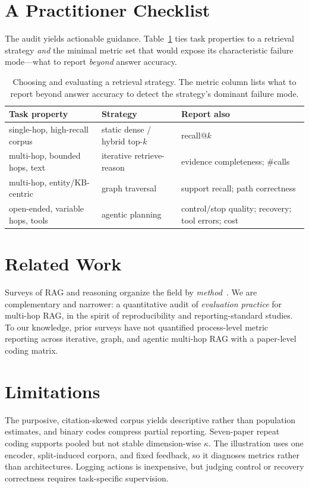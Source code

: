 \documentclass[11pt]{article}
\begin{document}
\section{A Practitioner Checklist}
\label{sec:checklist}
The audit yields actionable guidance. Table~\ref{tab:checklist} ties task properties to a retrieval
strategy \emph{and} the minimal metric set that would expose its characteristic failure mode---what to
report \emph{beyond} answer accuracy.

\begin{table}[t]\centering\small
\caption{Choosing and evaluating a retrieval strategy. The metric column lists what to report beyond
answer accuracy to detect the strategy's dominant failure mode.}
\label{tab:checklist}
\begin{tabular}{@{}p{2.1cm}p{2.2cm}p{2.35cm}@{}}
\toprule
\textbf{Task property} & \textbf{Strategy} & \textbf{Report also} \\
\midrule
single-hop, high-recall corpus & static dense / hybrid top-$k$ & recall@$k$ \\
multi-hop, bounded hops, text & iterative retrieve-reason & evidence completeness; \#calls \\
multi-hop, entity/KB-centric & graph traversal & support recall; path correctness \\
open-ended, variable hops, tools & agentic planning & control/stop quality; recovery; tool errors; cost \\
\bottomrule
\end{tabular}
\end{table}

\section{Related Work}
Surveys of RAG and reasoning organize the field by
\emph{method}~\citep{gao2023survey,rag_reasoning_survey_2025,agentic_rag_survey_2026}. We are
complementary and narrower: a quantitative audit of \emph{evaluation practice} for multi-hop RAG, in
the spirit of reproducibility and reporting-standard studies. To our knowledge, prior surveys have
not quantified process-level metric reporting across iterative, graph, and agentic multi-hop RAG with
a paper-level coding matrix.

\section{Limitations}
The purposive, citation-skewed corpus yields descriptive rather than population estimates, and binary
codes compress partial reporting. Seven-paper repeat coding supports pooled but not stable dimension-wise
$\kappa$. The illustration uses one encoder, split-induced corpora, and fixed feedback, so it diagnoses
metrics rather than architectures. Logging actions is inexpensive, but judging control or recovery correctness
requires task-specific supervision.
\end{document}
